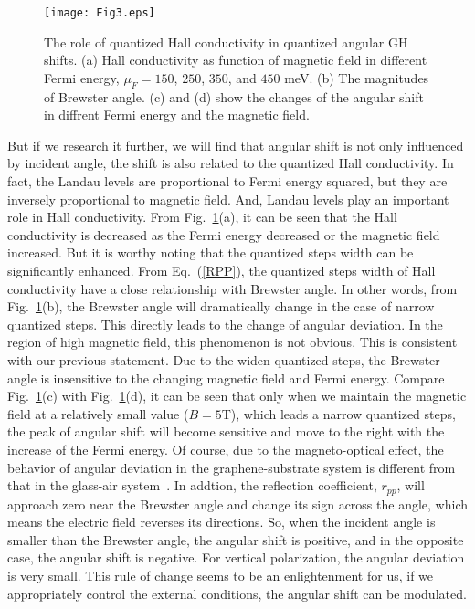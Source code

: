 \documentclass[twocolumn,showpacs,preprintnumbers,amsmath,amssymb]{revtex4}
\begin{document}
\begin{figure}
\centerline{\texttt{[image: Fig3.eps]}}
\caption{\label{Fig3} The role of quantized Hall conductivity in quantized angular GH shifts.
(a) Hall conductivity as function of magnetic field
in different Fermi energy, $\mu_{F}=150$, $250$, $350$, and $450$ meV.
(b) The magnitudes of Brewster angle.
(c) and (d) show the changes
of the angular shift in diffrent Fermi
energy and the magnetic field.}
\end{figure}

But if we research it further, we will find that angular shift is not only
influenced by incident angle,
the shift is also related to the quantized Hall conductivity. In fact,
the Landau levels are proportional to Fermi energy squared,
but they are inversely proportional to magnetic field.
And, Landau levels play an important role in Hall conductivity.
From Fig.~\ref{Fig3}(a), it can be seen that the Hall conductivity is decreased
as the Fermi energy decreased or the magnetic field increased.
But it is worthy noting that the quantized steps width can be significantly enhanced.
From Eq.~(\ref{RPP}),
the quantized steps width of Hall conductivity have a close relationship with Brewster angle.
In other words, from Fig.~\ref{Fig3}(b),
the Brewster angle will dramatically change in the case of narrow quantized steps.
This directly leads to the change of angular deviation.
In the region of high magnetic field, this phenomenon is not obvious.
This is consistent with our previous statement.
Due to the widen quantized steps, the Brewster angle is insensitive to the changing magnetic field and Fermi energy.
Compare Fig.~\ref{Fig3}(c) with Fig.~\ref{Fig3}(d), it can be seen that only when we maintain the
magnetic field at a relatively small value ($B=5$T), which leads a narrow quantized steps,
the peak of angular shift will become sensitive and move to the right
with the increase of the Fermi energy.
Of course, due to the magneto-optical effect,
the behavior of angular deviation in the graphene-substrate system is different from
that in the glass-air system~\cite{Merano2010}.
In addtion, the reflection coefficient, $r_{pp}$,
will approach zero near the Brewster angle and change its sign
across the angle, which means the electric field reverses its directions.
So, when the incident angle is smaller than the Brewster angle,
the angular shift is positive, and in the opposite case, the angular shift is negative.
For vertical polarization,
the angular deviation is very small.
This rule of change seems to be an enlightenment for
us, if we appropriately control the external conditions,
the angular shift can be modulated.
\end{document}
